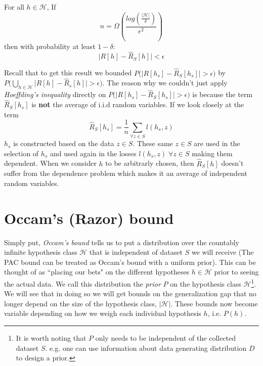 \documentclass{article}
\begin{document}

\begin{thm} For all $h \in \mathcal{H}$, If
\[
	n=\Omega\left(\frac{log(\frac{|\mathcal{H}|}{\delta})}{\epsilon^2}\right)
\]
then with probability at least $1-\delta$:
\[
\big|R[h]-\hat{R}_S[h] \big|<\epsilon
\]
\end{thm}




Recall that to get this result we bounded $P \big( \big|R[h_s]-\hat{R}_S[h_s] \big|>\epsilon \big)$ by $P \big( \bigcup_{h \in \mathcal{H}} \big|R[h]-\hat{R}_s[h] \big|>\epsilon \big)$. 
The reason why we couldn't just apply \textit{Hoeffding's inequality} directly on $P \big( \big|R[h_s]-\hat{R}_S[h_s] \big|>\epsilon \big)$ is because the term $\hat{R}_S[h_s]$ is \textbf{not} the average of i.i.d random variables. If we look closely at the term  $$\hat{R}_S[h_s] = \frac{1}{n} \sum_{\forall z \in S} l(h_s,z) $$
$h_s$ is constructed based on the data $z \in S$. These same $z \in S$ are used in the selection of $h_s$ and used again in the losses $l(h_s,z) \; \forall z \in S$ making them dependent. When we consider $h$ to be arbitrarly chosen, then $\hat{R}_S[h]$ doesn't suffer from the dependence problem which makes it an average of independent random variables.


\section{Occam's (Razor) bound } 

Simply put, \emph{Occam's bound} tells us to put a distribution over the countably infinite hypothesis class $\mathcal{H}$ that is independent of dataset $S$ we will receive (The PAC bound can be treated as Occam's bound with a uniform prior).
This can be thought of as ``placing our bets" on the different hypotheses $h \in \mathcal{H}$ prior to seeing the actual data.
We call this distribution the \textit{prior} $P$ on the hypothesis class $\mathcal{H}$\footnote{It is worth noting that $P$ only needs to be independent of the collected dataset $S$. e.g. one can use information about data generating distribution $D$ to design a prior.}. We will see that in doing so we will get bounds on the generalization gap that no longer depend on the size of the hypothesis class, $|\mathcal{H}|$. These bounds now become variable depending on how we weigh each individual hypothesis $h$, i.e. $P(h)$.
\end{document}
